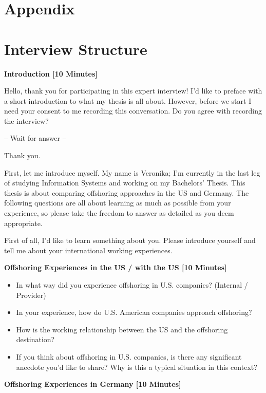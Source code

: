 \begin{appendix}
\section*{Appendix}
\label{Appendix}

\tocless\section{Interview Structure}

\label{app:InterviewStructure}

{\bf Introduction [10 Minutes]}

Hello, thank you for participating in this expert interview! I’d like to preface with a short introduction to what my thesis is all about. However, before we start I need your consent to me recording this conversation. Do you agree with recording the interview?

 – Wait for answer –
 
Thank you.

First, let me introduce myself. My name is Veronika; I’m currently in the last leg of studying Information Systems and working on my Bachelors’ Thesis. This thesis is about comparing offshoring approaches in the US and Germany. 
The following questions are all about learning as much as possible from your experience, so please take the freedom to answer as detailed as you deem appropriate.

First of all, I’d like to learn something about you. Please introduce yourself and tell me about your international working experiences.

{\bf Offshoring   Experiences in the US / with the US [10 Minutes]}
\begin{itemize}
	\item In what way did you experience offshoring in U.S. companies? (Internal / Provider)
	\item In your experience, how do U.S. American companies approach offshoring?
	\item How is the working relationship between the US and the offshoring destination?
	\item If you think about offshoring in U.S. companies, is there any significant anecdote you’d like to share? Why is this a typical situation in this context?
\end{itemize}
	
{\bf Offshoring Experiences in Germany [10 Minutes]}


\end{appendix}

